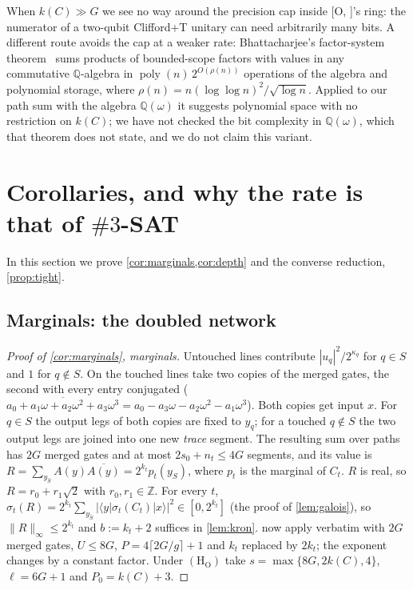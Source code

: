 \documentclass[10pt]{amsart}
\theoremstyle{plain}
\theoremstyle{definition}
\theoremstyle{remark}
\numberwithin{equation}{section}
\newcommand{\Z}{\mathbb{Z}}
\newcommand{\poly}{\operatorname{poly}}
\newcommand{\amp}[3]{\langle #1|#2|#3\rangle}
\newcommand{\Oa}[1][]{\textup{[O\if\relax\detokenize{#1}\relax\else, #1\fi]}}
\begin{document}
When $k(C)\gg G$ we see no way around the precision cap inside \Oa's ring: the numerator of a
two-qubit Clifford+T unitary can need arbitrarily many bits. A different route avoids the cap at a
weaker rate: Bhattacharjee's factor-system theorem~\cite[Thm.~5.3]{Bhattacharjee26} sums products of
bounded-scope factors with values in any commutative $\mathbb{Q}$-algebra in $\poly(n)\,2^{O(\rho(n))}$
operations of the algebra and polynomial storage, where $\rho(n)=n(\log\log n)^2/\sqrt{\log n}$.
Applied to our path sum with the algebra $\mathbb{Q}(\omega)$ it suggests polynomial space with no
restriction on $k(C)$; we have not checked the bit complexity in $\mathbb{Q}(\omega)$, which that theorem
does not state, and we do not claim this variant.

\section{Corollaries, and why the rate is that of \texorpdfstring{$\#3$}{\#3}-SAT}\label{sec:corollaries}

In this section we prove \cref{cor:marginals,cor:depth} and the converse reduction,
\cref{prop:tight}.

\subsection{Marginals: the doubled network}
\begin{proof}[Proof of \cref{cor:marginals}, marginals]
Untouched lines contribute $|u_q|^2/2^{\kappa_q}$ for $q\in S$ and $1$ for $q\notin S$. On the
touched lines take two copies of the merged gates, the second with every entry conjugated
($\overline{a_0+a_1\omega+a_2\omega^2+a_3\omega^3}=a_0-a_3\omega-a_2\omega^2-a_1\omega^3$). Both
copies get input $x$. For $q\in S$ the output legs of both copies are fixed to $y_q$; for a touched
$q\notin S$ the two output legs are joined into one new \emph{trace} segment. The resulting sum over
paths has $2G$ merged gates and at most $2s_0+n_t\le4G$ segments, and its value is
$R=\sum_{y_{\bar S}}A(y)\overline{A(y)}=2^{k_t}p_t(y_S)$, where $p_t$ is the marginal of $C_t$.
$R$ is real, so $R=r_0+r_1\sqrt2$ with $r_0,r_1\in\Z$. For every $t$,
$\sigma_t(R)=2^{k_t}\sum_{y_{\bar S}}|\amp{y}{\sigma_t(C_t)}{x}|^2\in[0,2^{k_t}]$ (the proof of
\cref{lem:galois}), so $\|R\|_\infty\le2^{k_t}$ and $b:=k_t+2$ suffices in \cref{lem:kron}.
 now apply verbatim with $2G$ merged gates, $U\le8G$,
$P=4\lceil2G/g\rceil+1$ and $k_t$ replaced by $2k_t$; the exponent changes by a constant factor.
Under $(\mathrm{H}_{\mathrm{O}})$ take $s=\max\{8G,2k(C),4\}$, $\ell=6G+1$ and $P_0=k(C)+3$.
\end{proof}
\end{document}
